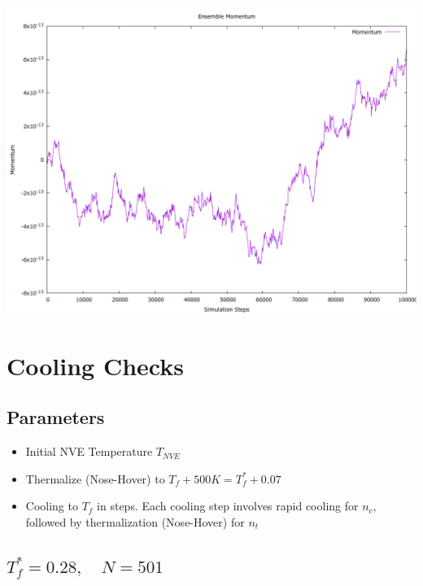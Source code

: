 \documentclass[a4paper,11pt,twoside]{article}
\begin{document}
\begin{center}
\includegraphics[width=.9\linewidth]{../../runs/nve_lammps_pair_style/plots/momentum.png}
\end{center}
\section{Cooling Checks}
\label{sec:orge757012}
\subsection{Parameters}
\label{sec:org767175a}
\begin{itemize}
\item Initial NVE Temperature \(T_{NVE}\)
\item Thermalize (Nose-Hover) to \(T_f + 500K = T^*_f + 0.07\)
\item Cooling to \(T_f\) in steps. Each cooling step involves rapid cooling for \(n_c\), followed by thermalization (Nose-Hover) for \(n_t\)
\end{itemize}
\subsection{\(T^*_f = 0.28, \quad N = 501\)}
\label{sec:org97cb660}
\end{document}
